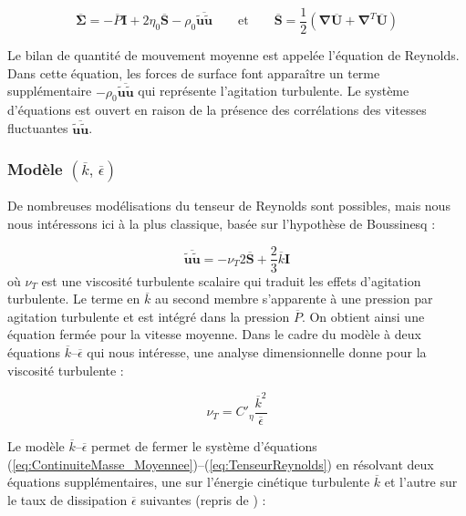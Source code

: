 \begin{equation}
\overline{\boldsymbol{\Sigma}}=-\overline{P}\mathbf{I}+2\eta_{0}\overline{\mathbf{S}}-\rho_{0}\overline{\tilde{\mathbf{u}}\tilde{\mathbf{u}}}\qquad\mbox{et}\qquad\overline{\mathbf{S}}=\frac{1}{2}(\boldsymbol{\nabla}\overline{\mathbf{U}}+\boldsymbol{\nabla}^{T}\overline{\mathbf{U}})\label{eq:TenseurReynolds}
\end{equation}


Le bilan de quantit\'e de mouvement moyenne est appel\'ee l'\'equation de
Reynolds. Dans cette \'equation, les forces de surface font appara\^itre
un terme suppl\'ementaire $-\rho_{0}\overline{\tilde{\mathbf{u}}\tilde{\mathbf{u}}}$
qui repr\'esente l'agitation turbulente. Le syst\`eme d'\'equations est
ouvert en raison de la pr\'esence des corr\'elations des vitesses fluctuantes
$\overline{\tilde{\mathbf{u}}\tilde{\mathbf{u}}}$.


\subsubsection{Mod\`ele $(\overline{k},\,\overline{\epsilon})$}

De nombreuses mod\'elisations du tenseur de Reynolds sont possibles,
mais nous nous int\'eressons ici \`a la plus classique, bas\'ee sur l\textquoteright hypoth\`ese
de Boussinesq : 

\begin{equation}
\overline{\tilde{\mathbf{u}}\tilde{\mathbf{u}}}=-\nu_{T}2\mathbf{\overline{S}}+\frac{2}{3}\overline{k}\mathbf{I}\label{eq:Hyp_Boussinesq}
\end{equation}
o\`u $\nu_{T}$ est une viscosit\'e turbulente scalaire qui traduit les
effets d\textquoteright agitation turbulente. Le terme en $\overline{k}$
au second membre s\textquoteright apparente \`a une pression par agitation
turbulente et est int\'egr\'e dans la pression $\overline{P}$. On obtient
ainsi une \'equation ferm\'ee pour la vitesse moyenne. Dans le cadre du
mod\`ele \`a deux \'equations $\overline{k}$--$\overline{\epsilon}$ qui
nous int\'eresse, une analyse dimensionnelle donne pour la viscosit\'e
turbulente :

\begin{equation}
\nu_{T}=C'_{\eta}\frac{\overline{k}^{2}}{\overline{\epsilon}}\label{eq:nu_T_RANS}
\end{equation}


Le mod\`ele $\overline{k}$--$\overline{\epsilon}$ permet de fermer
le syst\`eme d'\'equations (\ref{eq:ContinuiteMasse_Moyennee})--(\ref{eq:TenseurReynolds})
en r\'esolvant deux \'equations suppl\'ementaires, une sur l'\'energie cin\'etique
turbulente $\overline{k}$ et l'autre sur le taux de dissipation $\overline{\epsilon}$
suivantes \cite[p. 469]{Book_Chassaing} (repris de \cite[Eq. (2.2-1 et 2.2-2)]{Launder-Spalding_NumCompTurbFlow1974})
:

